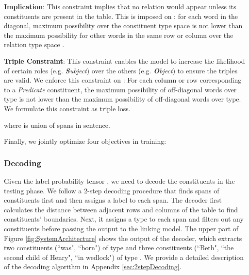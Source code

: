 \documentclass[11pt,a4paper]{article}
\begin{document}
\vspace{-0.5em}

\noindent
\textbf{Implication}: This constraint implies that no relation would appear unless its constituents are present in the table. This is imposed on : for each word in the diagonal, maximum possibility over the constituent type space  is not lower than the maximum possibility for other words in the same row or column over the relation type space .
\vspace{-0.3em}
 
\vspace{-0.5em}

\noindent
\textbf{Triple Constraint}: 
{This constraint enables the model to increase the likelihood of certain roles (e.g. \emph{\textbf{S}ubject}) over the others (e.g. \emph{\textbf{O}bject}) to ensure the triples are valid. We enforce this constraint on : For each column or row corresponding to a \emph{Predicate} constituent, the maximum possibility of off-diagonal words over  type is not lower than the maximum possibility of off-diagonal words over  type. We formulate this constraint as triple loss. }

\vspace{-0.5em}

\vspace{-0.2em}

\noindent
where  is union of  spans in sentence.


Finally, we jointly optimize four objectives in training: 

\subsubsection{Decoding}
\label{'sec3.1.3'}

Given the label probability tensor , we need to decode the constituents in the testing phase. We follow a 2-step decoding procedure that finds spans of constituents first and then assigns a label to each span. The decoder first calculates the distance between adjacent rows and columns of the table to find constituents' boundaries. Next, it assigns a type to each span and filters out any  constituents before passing the output to the linking model. The upper part of Figure \ref{fig:SystemArchitecture} shows the output of the decoder, which extracts two constituents (``was", ``born") of type  and three constituents (``Beth", ``the second child of Henry", ``in wedlock") of type . We provide a detailed description of the decoding algorithm in Appendix \ref{sec:2stepDecoding}.
\end{document}
